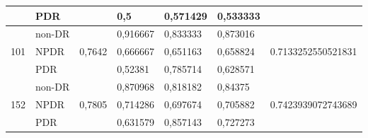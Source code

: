 \begin{table}[h!]
\begin{center}
\begin{tabular}{|c|l|c|l|l|l|c|}
                                  & PDR                        &                         & 0,5                       & 0,571429                 & 0,533333                &                                     \\ \hline
            \multirow{3}{*}{101}  & non-DR                     & \multirow{3}{*}{0,7642} & 0,916667                  & 0,833333                 & 0,873016                & \multirow{3}{*}{0.7133252550521831} \\ \cline{2-2} \cline{4-6}
                                  & NPDR                       &                         & 0,666667                  & 0,651163                 & 0,658824                &                                     \\ \cline{2-2} \cline{4-6}
                                  & PDR                        &                         & 0,52381                   & 0,785714                 & 0,628571                &                                     \\ \hline
            \multirow{3}{*}{152}  & non-DR                     & \multirow{3}{*}{0,7805} & 0,870968                  & 0,818182                 & 0,84375                 & \multirow{3}{*}{0.7423939072743689} \\ \cline{2-2} \cline{4-6}
                                  & NPDR                       &                         & 0,714286                  & 0,697674                 & 0,705882                &                                     \\ \cline{2-2} \cline{4-6}
                                  & PDR                        &                         & 0,631579                  & 0,857143                 & 0,727273                &                                     \\ \hline
            \end{tabular}
        \end{center}
    \end{table}
